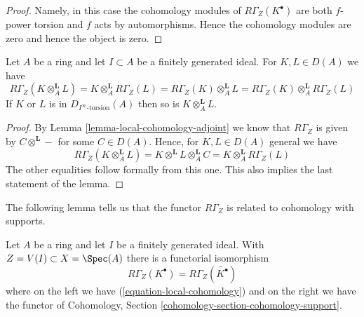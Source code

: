 \begin{proof}
Namely, in this case the cohomology modules of $R\Gamma_Z(K^\bullet)$
are both $f$-power torsion and $f$ acts by automorphisms. Hence the
cohomology modules are zero and hence the object is zero.
\end{proof}

\begin{lemma}
\label{lemma-torsion-tensor-product}
Let $A$ be a ring and let $I \subset A$ be a finitely generated ideal.
For $K, L \in D(A)$ we have
$$
R\Gamma_Z(K \otimes_A^\mathbf{L} L) =
K \otimes_A^\mathbf{L} R\Gamma_Z(L) =
R\Gamma_Z(K) \otimes_A^\mathbf{L} L =
R\Gamma_Z(K) \otimes_A^\mathbf{L} R\Gamma_Z(L)
$$
If $K$ or $L$ is in $D_{I^\infty\text{-torsion}}(A)$ then so is
$K \otimes_A^\mathbf{L} L$.
\end{lemma}

\begin{proof}
By Lemma \ref{lemma-local-cohomology-adjoint} we know that
$R\Gamma_Z$ is given by $C \otimes^\mathbf{L} -$ for some $C \in D(A)$.
Hence, for $K, L \in D(A)$ general we have
$$
R\Gamma_Z(K \otimes_A^\mathbf{L} L) =
K \otimes^\mathbf{L} L \otimes_A^\mathbf{L} C =
K \otimes_A^\mathbf{L} R\Gamma_Z(L)
$$
The other equalities follow formally from this one. This also implies
the last statement of the lemma.
\end{proof}

\noindent
The following lemma tells us that the functor $R\Gamma_Z$
is related to cohomology with supports.

\begin{lemma}
\label{lemma-local-cohomology-is-local-cohomology}
Let $A$ be a ring and let $I$ be a finitely generated ideal.
With $Z = V(I) \subset X = \Spec(A)$ there is a functorial
isomorphism
$$
R\Gamma_Z(K^\bullet) = R\Gamma_Z(\widetilde{K^\bullet})
$$
where on the left we have (\ref{equation-local-cohomology})
and on the right we have the functor of
Cohomology, Section \ref{cohomology-section-cohomology-support}.
\end{lemma}

